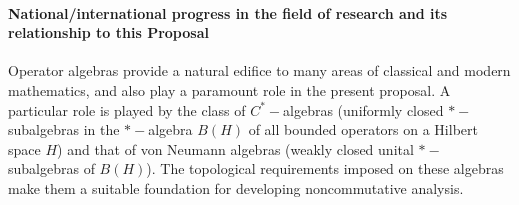 \documentclass[12pt]{article}
\begin{document}
%
%
%


\paragraph*{National/international progress in the field of research and its relationship to this Proposal}

Operator algebras provide a natural edifice to many areas of classical and modern mathematics, and also play a paramount role in the present proposal. 
A particular role is played by the class of $C^{\ast}-$algebras (uniformly closed $\ast-$subalgebras in the $\ast-$algebra $B(H)$ of all bounded operators on a Hilbert space $H$) and that of von Neumann algebras (weakly closed unital $\ast-$subalgebras of $B(H)$). The topological requirements imposed on these algebras make them a suitable foundation for developing noncommutative analysis. 
\end{document}
